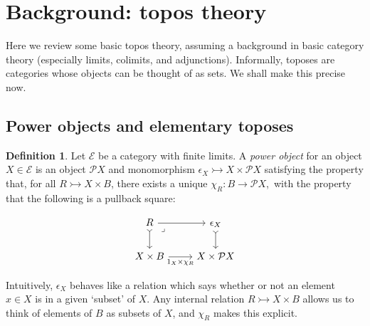 \documentclass{article}
\theoremstyle{definition}
\newtheorem{definition}{Definition}[section]
\newcommand{\cE}{\mathcal{E}}
\newcommand{\cP}{\mathcal{P}}
\begin{document}



\appendix


\section{Background: topos theory}
\label{sec:top}
Here we review some basic topos theory, assuming a background in basic category theory (especially limits, colimits, and adjunctions). 
Informally, toposes are categories whose objects can be thought of as sets. We shall make this precise now.

\subsection{Power objects and elementary toposes}


\begin{minipage}{0.7\linewidth}
\begin{definition}
    Let $\cE$ be a category with finite limits. A {\it power object} for an object $X \in \cE$ is an object $\cP X$ and monomorphism $\epsilon_X \rightarrowtail X \times \cP X$ satisfying the property that, for all $R \rightarrowtail X\times B$, there exists a unique $\chi_R\colon B\to \cP X$,\footnotemark~with the property that the following is a pullback square:
\end{definition}

\end{minipage}
\begin{minipage}{0.25\linewidth}


    \[\begin{tikzcd}
	R & {\epsilon_X} \\
	{X\times B} & {X\times \mathcal{P} X}
	\arrow[from=1-1, to=1-2]
	\arrow[tail, from=1-1, to=2-1]
	\arrow["\lrcorner"{anchor=center, pos=0.125}, draw=none, from=1-1, to=2-2]
	\arrow[tail, from=1-2, to=2-2]
	\arrow["{1_X\times \chi_R}"', from=2-1, to=2-2]
\end{tikzcd}\]

\end{minipage}


\vspace{2mm}


Intuitively, $\epsilon_X$ behaves like a relation which says whether or not an element $x \in X$ is in a given `subset' of $X$. Any internal relation $R\rightarrowtail X \times B$ allows us to think of elements of $B$ as subsets of $X$, and $\chi_R$ makes this explicit. 
\end{document}
